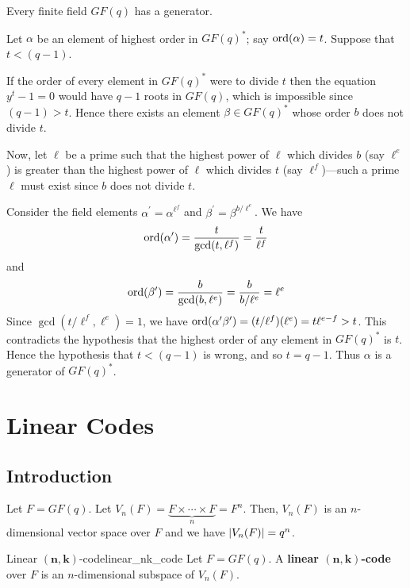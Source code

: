 \begin{Theorem}{}{}
    Every finite field $ GF(q) $ has a generator.
\end{Theorem}

\begin{Proof}{}{}
    Let $ \alpha $ be an element of highest order in $ GF(q)^* $;
    say $ \operatorname{ord}(\alpha)=t $. Suppose that $ t<(q-1) $.

    If the order of every element in $ GF(q)^* $ were to divide $ t $ then the equation
    $ y^t-1=0 $ would have $ q-1 $ roots in $ GF(q) $, which is impossible
    since $ (q-1)>t $. Hence there exists an element $ \beta\in GF(q)^* $
    whose order $ b $ does not divide $ t $.

    Now, let $ \ell $ be a prime such that the highest power of $ \ell $
    which divides $ b $ (say $ \ell^e $) is greater than the highest
    power of $ \ell $ which divides $ t $ (say $ \ell^f $)---such a prime
    $ \ell $ must exist since $ b $ does not divide $ t $.

    Consider the field elements $ \alpha^{\prime}=\alpha^{\ell^f} $
    and $ \beta^{\prime}=\beta^{b/\ell^e} $. We have
    \[ \operatorname{ord}(\alpha^{\prime})=\frac{t}{\gcd(t,\ell^f)} =\frac{t}{\ell^f} \]
    and
    \[ \operatorname{ord}(\beta^{\prime})=\frac{b}{\gcd(b,\ell^e)} =\frac{b}{b/\ell^e}=\ell^e \]
    Since $ \gcd(t/\ell^f,\ell^e)=1 $, we have $ \operatorname{ord}(\alpha^{\prime}\beta^{\prime})=
        (t/\ell^f)(\ell^e)=t\ell^{e-f}>t $. This contradicts the hypothesis
    that the highest order of any element in $ GF(q)^* $ is $ t $. Hence the
    hypothesis that $ t<(q-1) $ is wrong, and so $ t=q-1 $. Thus $ \alpha $
    is a generator of $ GF(q)^* $.
\end{Proof}

\chapter{Linear Codes}
\section{Introduction}
Let $ F=GF(q) $. Let $ V_n(F)=\underbrace{F\times\cdots\times F}_{n}=F^n $.
Then, $ V_n(F) $ is an $ n $-dimensional vector space over $ F $ and
we have $ \lvert V_n(F)\rvert=q^n $.

\begin{Definition}{Linear $ \symbf{(n,k)} $-code}{linear_nk_code}
    Let $ F=GF(q) $.
    A \textbf{linear $ \symbf{(n,k)} $-code} over $ F $ is an $ n $-dimensional subspace
    of $ V_n(F) $.
\end{Definition}

